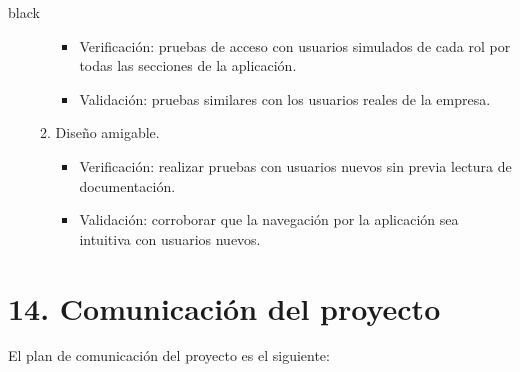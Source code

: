 \documentclass[11pt]{charter}
\begin{document}
\begin{consigna}{black}
\begin{enumerate}
\begin{enumerate}
	\begin{itemize}
	\item Verificación: pruebas de acceso con usuarios simulados de cada rol por todas las secciones de la aplicación. 
	\item Validación: pruebas similares con los usuarios reales de la empresa.  
	\end{itemize}
	\item Diseño amigable.
	\begin{itemize}
	\item Verificación: realizar pruebas con usuarios nuevos sin previa lectura de documentación. 
	\item Validación: corroborar que la navegación por la aplicación sea intuitiva con usuarios nuevos.  
	\end{itemize}
	\end{enumerate}
\end{enumerate}

\end{consigna}

\section{14. Comunicación del proyecto}
\label{sec:comunicaciones}

El plan de comunicación del proyecto es el siguiente:
\end{document}

